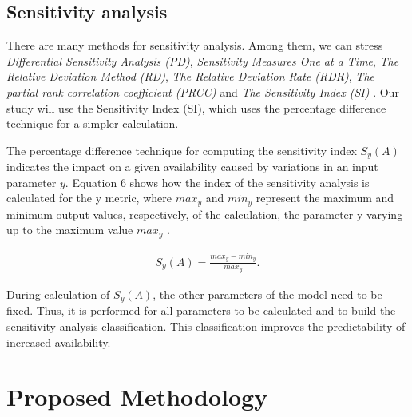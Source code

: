\documentclass[conference]{IEEEtran}
\begin{document}
\subsection{Sensitivity analysis}

There are many methods for sensitivity analysis. Among them, we can stress \textit{Differential Sensitivity Analysis (PD)}, \textit{Sensitivity Measures One at a Time}, \textit{The Relative Deviation Method (RD)}, \textit{The Relative Deviation Rate (RDR)}, \textit{The partial rank correlation coefficient (PRCC)} and \textit{The Sensitivity Index (SI)} \citep{hamby1995comparison}. Our study will use the Sensitivity Index (SI), which uses the percentage difference technique for a simpler calculation.

The percentage difference technique for computing the sensitivity index $S_y(A)$ indicates the impact on a given availability caused by variations in an input parameter $y$. Equation 6 shows how the index of the sensitivity analysis is calculated for the y metric, where $max_y$ and $min_y$ represent the maximum and minimum output values, respectively, of the calculation, the parameter y varying up to  the maximum value $max_y$ \citep{clemente2022availability}.

\begin{align}\label{eq:sa}
S_y(A) = \frac{max_y - min_y}{max_y}.
\end{align}

During calculation of $S_y(A)$, the other parameters of the model need to be fixed. Thus, it is performed for all parameters to be calculated and to build the sensitivity analysis classification. This classification improves the predictability of increased availability.



\section{Proposed Methodology}\label{sec:methodology}
\end{document}
